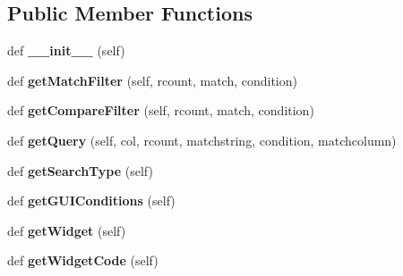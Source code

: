 \subsection*{Public Member Functions}
\begin{DoxyCompactItemize}
\item 
\mbox{\label{classdatatypes_1_1Admin__Area_1_1Admin__Area_a8717bfca3a365b492ca6189b278f0f0b}} 
def {\bfseries \+\_\+\+\_\+init\+\_\+\+\_\+} (self)
\item 
\mbox{\label{classdatatypes_1_1Admin__Area_1_1Admin__Area_aa73ea473d571296bf30a2444d5f21fe0}} 
def {\bfseries get\+Match\+Filter} (self, rcount, match, condition)
\item 
\mbox{\label{classdatatypes_1_1Admin__Area_1_1Admin__Area_aa9a48ae9637b62c5afc251ff19a630c6}} 
def {\bfseries get\+Compare\+Filter} (self, rcount, match, condition)
\item 
\mbox{\label{classdatatypes_1_1Admin__Area_1_1Admin__Area_a39b3196f45dcb7e6a92f0942fad28ee0}} 
def {\bfseries get\+Query} (self, col, rcount, matchstring, condition, matchcolumn)
\item 
\mbox{\label{classdatatypes_1_1Admin__Area_1_1Admin__Area_a2031b97ee2f081c670e8a91a9c1c73d5}} 
def {\bfseries get\+Search\+Type} (self)
\item 
\mbox{\label{classdatatypes_1_1Admin__Area_1_1Admin__Area_af3d3973d0a8c0a888c0a5d2fc9e66480}} 
def {\bfseries get\+G\+U\+I\+Conditions} (self)
\item 
\mbox{\label{classdatatypes_1_1Admin__Area_1_1Admin__Area_a303c7b22180bbc7a113f21709a585582}} 
def {\bfseries get\+Widget} (self)
\item 
\mbox{\label{classdatatypes_1_1Admin__Area_1_1Admin__Area_a9cf29675992244bfc386c36fe2ab37ef}} 
def {\bfseries get\+Widget\+Code} (self)
\end{DoxyCompactItemize}

